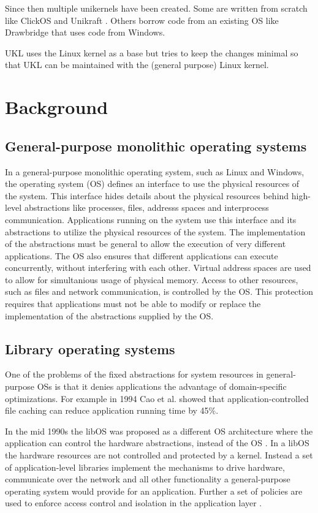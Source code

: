 \documentclass[10pt,twocolumn,a4paper]{article}
\begin{document}
  Since then multiple unikernels have been created. Some are written from scratch like
  ClickOS \cite{martins2014} and Unikraft \cite{kuenzer21}.
  Others borrow code from an existing OS like Drawbridge \cite{porter11} 
  that uses code from Windows.

  UKL uses the Linux kernel as a base but tries to keep the changes minimal
  so that UKL can be maintained with the (general purpose) Linux kernel.
  

\section{Background}\label{sec:background}
  \subsection{General-purpose monolithic operating systems}
    In a general-purpose monolithic operating system, such as Linux and Windows,
    the operating system (OS) defines an interface to use the physical resources
    of the system. 
    This interface hides details about the physical resources behind
    high-level abstractions like processes, files, addresss spaces 
    and interprocess communication.
    Applications running on the system use this interface and its abstractions
    to utilize the physical resources of the system.
    The implementation of the abstractions must be general to allow the execution 
    of very different applications.
    The OS also ensures that different applications can execute concurrently, 
    without interfering with each other. 
    Virtual address spaces are used to allow for simultanious usage of physical memory.
    Access to other resources, such as files and network communication, is controlled
    by the OS.
    This protection requires that applications must not be able
    to modify or replace the implementation of the abstractions supplied by the OS.

  \subsection{Library operating systems}\label{sec:libOS}
    One of the problems of the fixed abstractions for system resources in general-purpose OSs
    is that it denies applications the advantage of domain-specific optimizations.
    For example in 1994 Cao et al. \cite{cao94} showed that application-controlled file caching
    can reduce application running time by 45\%.

    In the mid 1990s the libOS was proposed as a different OS architecture
    where the application can control the hardware abstractions, instead of the OS \cite{engler95}.
    In a libOS the hardware resources are not controlled and protected by a kernel.
    Instead a set of application-level libraries implement the mechanisms to drive hardware,
    communicate over the network and all other functionality a general-purpose 
    operating system would provide for an application.
    Further a set of policies are used to enforce access control and isolation in the
    application layer \cite{madhavapeddy13-2}.
    
\end{document}
